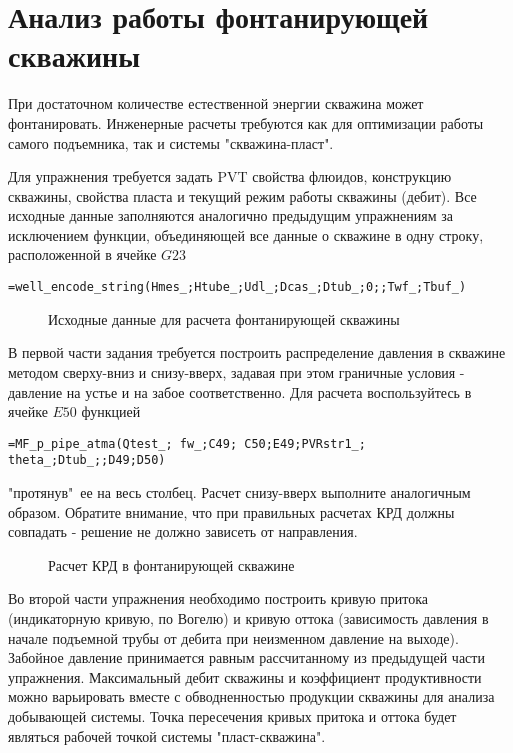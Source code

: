

\section{Анализ работы фонтанирующей скважины}

При достаточном количестве естественной энергии скважина может фонтанировать. Инженерные расчеты требуются как для оптимизации работы самого подъемника, так и системы "скважина-пласт".

Для упражнения требуется задать PVT свойства флюидов, конструкцию скважины, свойства пласта и текущий режим работы скважины (дебит). Все исходные данные заполняются аналогично предыдущим упражнениям за исключением функции, объединяющей все данные о скважине в одну строку, расположенной в ячейке  $G23$

{ \small  \texttt{=well\_encode\_string(Hmes\_;Htube\_;Udl\_;Dcas\_;Dtub\_;0;;Twf\_;Tbuf\_)
}}

\begin{figure}[h!]
	\center{\texttt{[image: Ex90\_1]}}
	\caption{Исходные данные для расчета фонтанирующей скважины}
	\label{ris:Ex90_1}
\end{figure}

В первой части задания требуется построить распределение давления в скважине методом сверху-вниз и снизу-вверх, задавая при этом граничные условия - давление на устье и на забое соответственно. Для расчета воспользуйтесь в ячейке $E50$ функцией

{ \small  \texttt{=MF\_p\_pipe\_atma(Qtest\_; fw\_;C49; C50;E49;PVRstr1\_; theta\_;Dtub\_;;D49;D50)
}}

"протянув"\ ее на весь столбец. Расчет снизу-вверх выполните аналогичным образом. Обратите внимание, что при правильных расчетах КРД должны совпадать - решение не должно зависеть от направления.

\begin{figure}[h!]
	\center{\texttt{[image: Ex90\_2]}}
	\caption{Расчет КРД в фонтанирующей скважине}
	\label{ris:Ex90_2}
\end{figure}

Во второй части упражнения необходимо построить кривую притока (индикаторную кривую, по Вогелю) и кривую оттока (зависимость давления в начале подъемной трубы от дебита при неизменном давление на выходе). Забойное давление принимается равным рассчитанному из предыдущей части упражнения. Максимальный дебит скважины и коэффициент продуктивности можно варьировать вместе с обводненностью продукции скважины для анализа добывающей системы. Точка пересечения кривых притока и оттока будет являться рабочей точкой системы "пласт-скважина".

